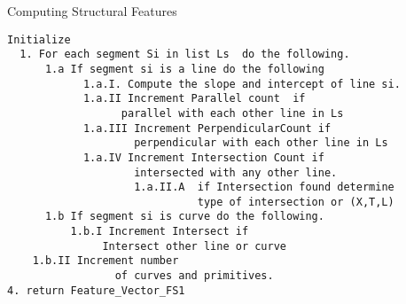	 \begin{algorithm}
\caption{Computing Structural Features}
\label{FeatureAlg}
	\begin{verbatim}
Initialize 
  1. For each segment Si in list Ls  do the following. 
      1.a If segment si is a line do the following 
            1.a.I. Compute the slope and intercept of line si. 
            1.a.II Increment Parallel count  if 
                  parallel with each other line in Ls
            1.a.III Increment PerpendicularCount if 
                    perpendicular with each other line in Ls 
            1.a.IV Increment Intersection Count if 
                    intersected with any other line. 
                    1.a.II.A  if Intersection found determine 
                              type of intersection or (X,T,L)
      1.b If segment si is curve do the following. 
          1.b.I Increment Intersect if
               Intersect other line or curve
    1.b.II Increment number 
                 of curves and primitives. 
4. return Feature_Vector_FS1
\end{verbatim}	
 \end{algorithm}

